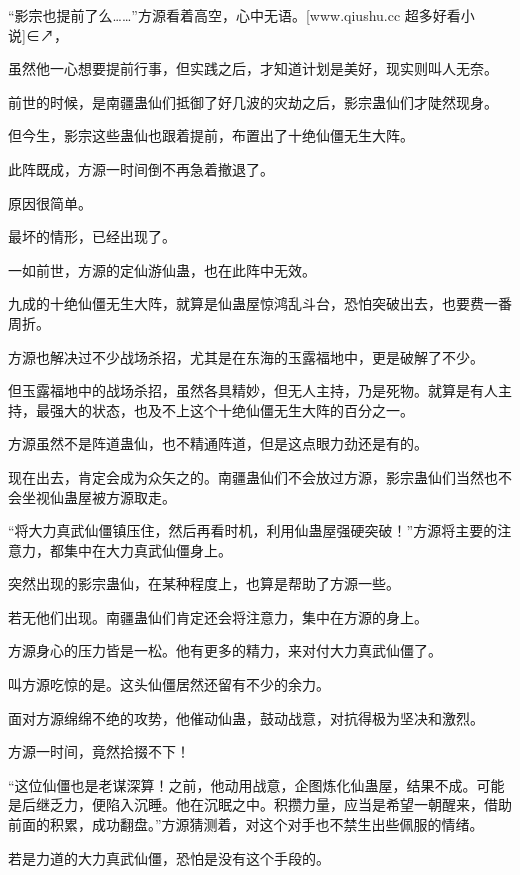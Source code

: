 
\begin{this_body}

“影宗也提前了么……”方源看着高空，心中无语。[www.qiushu.cc 超多好看小说]∈↗，

虽然他一心想要提前行事，但实践之后，才知道计划是美好，现实则叫人无奈。

前世的时候，是南疆蛊仙们抵御了好几波的灾劫之后，影宗蛊仙们才陡然现身。

但今生，影宗这些蛊仙也跟着提前，布置出了十绝仙僵无生大阵。

此阵既成，方源一时间倒不再急着撤退了。

原因很简单。

最坏的情形，已经出现了。

一如前世，方源的定仙游仙蛊，也在此阵中无效。

九成的十绝仙僵无生大阵，就算是仙蛊屋惊鸿乱斗台，恐怕突破出去，也要费一番周折。

方源也解决过不少战场杀招，尤其是在东海的玉露福地中，更是破解了不少。

但玉露福地中的战场杀招，虽然各具精妙，但无人主持，乃是死物。就算是有人主持，最强大的状态，也及不上这个十绝仙僵无生大阵的百分之一。

方源虽然不是阵道蛊仙，也不精通阵道，但是这点眼力劲还是有的。

现在出去，肯定会成为众矢之的。南疆蛊仙们不会放过方源，影宗蛊仙们当然也不会坐视仙蛊屋被方源取走。

“将大力真武仙僵镇压住，然后再看时机，利用仙蛊屋强硬突破！”方源将主要的注意力，都集中在大力真武仙僵身上。

突然出现的影宗蛊仙，在某种程度上，也算是帮助了方源一些。

若无他们出现。南疆蛊仙们肯定还会将注意力，集中在方源的身上。

方源身心的压力皆是一松。他有更多的精力，来对付大力真武仙僵了。

叫方源吃惊的是。这头仙僵居然还留有不少的余力。

面对方源绵绵不绝的攻势，他催动仙蛊，鼓动战意，对抗得极为坚决和激烈。

方源一时间，竟然拾掇不下！

“这位仙僵也是老谋深算！之前，他动用战意，企图炼化仙蛊屋，结果不成。可能是后继乏力，便陷入沉睡。他在沉眠之中。积攒力量，应当是希望一朝醒来，借助前面的积累，成功翻盘。”方源猜测着，对这个对手也不禁生出些佩服的情绪。

若是力道的大力真武仙僵，恐怕是没有这个手段的。


\end{this_body}
